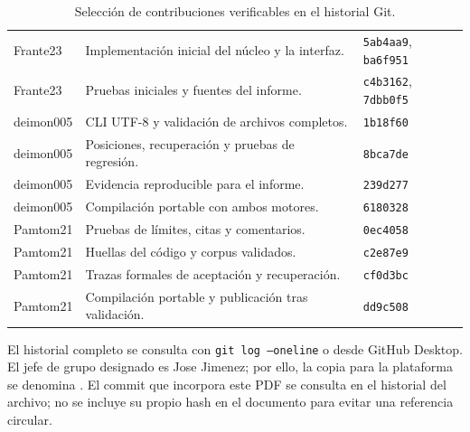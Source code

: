 \begin{table}[H]
\centering
\small
\caption{Selección de contribuciones verificables en el historial Git.}
\label{tab:contribuciones}
\begin{tabularx}{\textwidth}{L{2.8cm}Y L{3cm}}
\toprule
{} &  &  \\
\midrule
Frante23 & Implementación inicial del núcleo y la interfaz. & \texttt{5ab4aa9}, \texttt{ba6f951} \\
 Frante23 & Pruebas iniciales y fuentes del informe. & \texttt{c4b3162}, \texttt{7dbb0f5} \\
deimon005 & CLI UTF-8 y validación de archivos completos. & \texttt{1b18f60} \\
 deimon005 & Posiciones, recuperación y pruebas de regresión. & \texttt{8bca7de} \\
deimon005 & Evidencia reproducible para el informe. & \texttt{239d277} \\
 deimon005 & Compilación portable con ambos motores. & \texttt{6180328} \\
 Pamtom21 & Pruebas de límites, citas y comentarios. & \texttt{0ec4058} \\
Pamtom21 & Huellas del código y corpus validados. & \texttt{c2e87e9} \\
 Pamtom21 & Trazas formales de aceptación y recuperación. & \texttt{cf0d3bc} \\
Pamtom21 & Compilación portable y publicación tras validación. & \texttt{dd9c508} \\
\bottomrule
\end{tabularx}
\end{table}

El historial completo se consulta con \texttt{git log --oneline} o desde GitHub Desktop. El jefe de grupo designado es Jose Jimenez; por ello, la copia para la plataforma se denomina . El commit que incorpora este PDF se consulta en el historial del archivo; no se incluye su propio hash en el documento para evitar una referencia circular.
